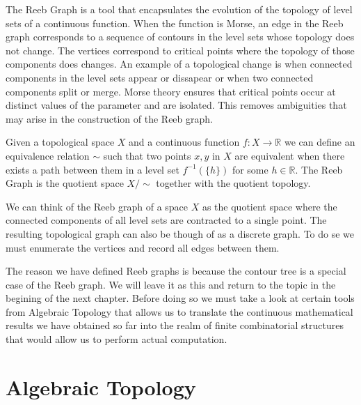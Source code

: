

The Reeb Graph is a tool that encapsulates the evolution of the topology of level sets of a continuous function. When the function is Morse, an edge in the Reeb graph corresponds to a sequence of contours in the level sets whose topology does not change. The vertices correspond to critical points where the topology of those components does changes. An example of a topological change is when connected components in the level sets appear or dissapear or when two connected components split or merge. Morse theory ensures that critical points occur at distinct values of the parameter and are isolated. This removes ambiguities that may arise in the construction of the Reeb graph.

\begin{defn}
Given a topological space $X$ and a continuous function $f: X \to \mathbb{R}$ we can define an equivalence relation $\sim$ such that two points $x, y$ in $X$ are equivalent when there exists a path between them in a level set $f^{-1}(\{h\})$ for some $h \in \mathbb{R}$. The Reeb Graph is the quotient space $X \big/ \sim$ together with the quotient topology.
\end{defn}

We can think of the Reeb graph of a space $X$ as the quotient space where the connected components of all level sets are contracted to a single point. The resulting topological graph can also be though of as a discrete graph. To do se we must enumerate the vertices and record all edges between them.

The reason we have defined Reeb graphs is because the contour tree is a special case of the Reeb graph. We will leave it as this and return to the topic in the begining of the next chapter. Before doing so we must take a look at certain tools from Algebraic Topology that allows us to translate the continuous mathematical results we have obtained so far into the realm of finite combinatorial structures that would allow us to perform actual computation.

\section{Algebraic Topology}

